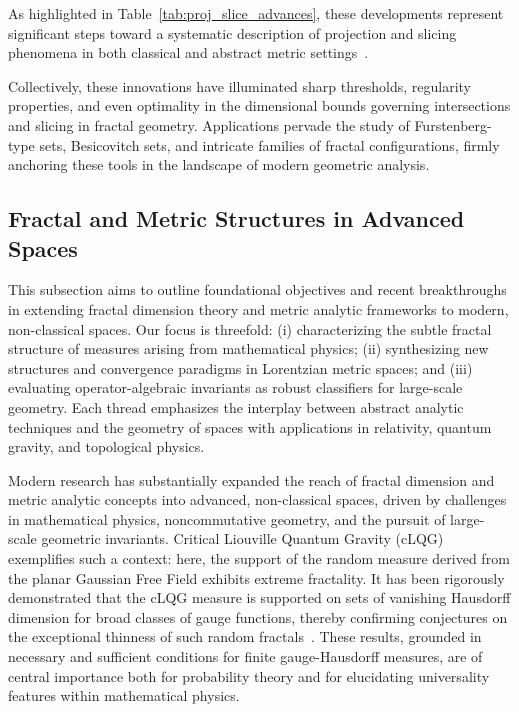 \documentclass[sigconf]{acmart}
\begin{document}
As highlighted in Table~\ref{tab:proj_slice_advances}, these developments represent significant steps toward a systematic description of projection and slicing phenomena in both classical and abstract metric settings~\cite{ref74, ref21, ref75}.

Collectively, these innovations have illuminated sharp thresholds, regularity properties, and even optimality in the dimensional bounds governing intersections and slicing in fractal geometry. Applications pervade the study of Furstenberg-type sets, Besicovitch sets, and intricate families of fractal configurations, firmly anchoring these tools in the landscape of modern geometric analysis.

\subsection{Fractal and Metric Structures in Advanced Spaces}

This subsection aims to outline foundational objectives and recent breakthroughs in extending fractal dimension theory and metric analytic frameworks to modern, non-classical spaces. Our focus is threefold: (i) characterizing the subtle fractal structure of measures arising from mathematical physics; (ii) synthesizing new structures and convergence paradigms in Lorentzian metric spaces; and (iii) evaluating operator-algebraic invariants as robust classifiers for large-scale geometry. Each thread emphasizes the interplay between abstract analytic techniques and the geometry of spaces with applications in relativity, quantum gravity, and topological physics.

Modern research has substantially expanded the reach of fractal dimension and metric analytic concepts into advanced, non-classical spaces, driven by challenges in mathematical physics, noncommutative geometry, and the pursuit of large-scale geometric invariants. Critical Liouville Quantum Gravity (cLQG) exemplifies such a context: here, the support of the random measure derived from the planar Gaussian Free Field exhibits extreme fractality. It has been rigorously demonstrated that the cLQG measure is supported on sets of vanishing Hausdorff dimension for broad classes of gauge functions, thereby confirming conjectures on the exceptional thinness of such random fractals~\cite{ref81}. These results, grounded in necessary and sufficient conditions for finite gauge-Hausdorff measures, are of central importance both for probability theory and for elucidating universality features within mathematical physics.
\end{document}
